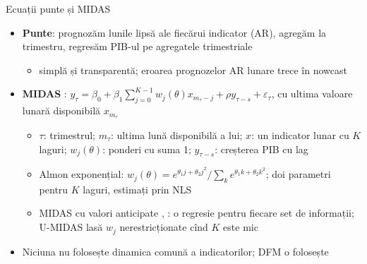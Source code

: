 \begin{frame}{Ecuații punte și MIDAS}
\itemsize{\small}
\begin{itemize}
    \item \textbf{Punte}: prognozăm lunile lipsă ale fiecărui indicator (AR), agregăm la trimestru, regresăm PIB-ul pe agregatele trimestriale 
    \begin{itemize}
        \item simplă și transparentă; eroarea prognozelor AR lunare trece în nowcast
    \end{itemize}
    \item \textbf{MIDAS} : $y_\tau = \beta_0 + \beta_1\sum_{j=0}^{K-1}w_j(\theta)x_{m_\tau - j} + \rho y_{\tau - s} + \varepsilon_\tau$, cu ultima valoare lunară disponibilă $x_{m_\tau}$
    \begin{itemize}
        \item $\tau$: trimestrul; $m_\tau$: ultima lună disponibilă a lui; $x$: un indicator lunar cu $K$ laguri; $w_j(\theta)$: ponderi cu suma 1; $y_{\tau - s}$: creșterea PIB cu lag
        \item Almon exponențial: $w_j(\theta) = e^{\theta_1j + \theta_2j^2}/\sum_ke^{\theta_1k + \theta_2k^2}$; doi parametri pentru $K$ laguri, estimați prin NLS
        \item MIDAS cu valori anticipate , : o regresie pentru fiecare set de informații; U-MIDAS lasă $w_j$ nerestricționate cînd $K$ este mic 
    \end{itemize}
    \item Niciuna nu folosește dinamica comună a indicatorilor; DFM o folosește
\end{itemize}
\end{frame}

